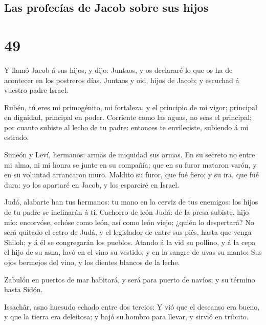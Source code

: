 \hypertarget{las-profecuxedas-de-jacob-sobre-sus-hijos}{%
\subsection{Las profecías de Jacob sobre sus
hijos}\label{las-profecuxedas-de-jacob-sobre-sus-hijos}}

\hypertarget{section-48}{%
\section{49}\label{section-48}}

 Y llamó Jacob á sus hijos, y dijo: Juntaos, y os
declararé lo que os ha de acontecer en los postreros días.
 Juntaos y oid, hijos de Jacob; y escuchad á vuestro padre
Israel.

 Rubén, tú eres mi primogénito, mi fortaleza, y el
principio de mi vigor; principal en dignidad, principal en poder.
 Corriente como las aguas, no seas el principal; por
cuanto subiste al lecho de tu padre: entonces te envileciste, subiendo á
mi estrado.

 Simeón y Leví, hermanos: armas de iniquidad sus armas.
 En su secreto no entre mi alma, ni mi honra se junte en
su compañía; que en su furor mataron varón, y en su voluntad arrancaron
muro.  Maldito su furor, que fué fiero; y su ira, que fué
dura: yo los apartaré en Jacob, y los esparciré en Israel.

 Judá, alabarte han tus hermanos: tu mano en la cerviz de
tus enemigos: los hijos de tu padre se inclinarán á ti. 
Cachorro de león Judá: de la presa subiste, hijo mío: encorvóse, echóse
como león, así como león viejo; ¿quién lo despertará?  No
será quitado el cetro de Judá, y el legislador de entre sus piés, hasta
que venga Shiloh; y á él se congregarán los pueblos. 
Atando á la vid su pollino, y á la cepa el hijo de su asna, lavó en el
vino su vestido, y en la sangre de uvas su manto:  Sus
ojos bermejos del vino, y los dientes blancos de la leche.

 Zabulón en puertos de mar habitará, y será para puerto
de navíos; y su término hasta Sidón.

 Issachâr, asno huesudo echado entre dos tercios:
 Y vió que el descanso era bueno, y que la tierra era
deleitosa; y bajó su hombro para llevar, y sirvió en tributo.

